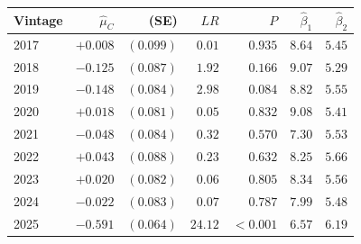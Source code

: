   \begin{tabular}{lrrrrrr}
    \hline
    Vintage & $\hat\mu_C$ & (SE) & $LR$ & $P$ & $\hat\beta_1$ & $\hat\beta_2$ \\
    \hline
    2017 & $+0.008$ & $(0.099)$ & $0.01$ & $0.935$ & $8.64$ & $5.45$ \\
    2018 & $-0.125$ & $(0.087)$ & $1.92$ & $0.166$ & $9.07$ & $5.29$ \\
    2019 & $-0.148$ & $(0.084)$ & $2.98$ & $0.084$ & $8.82$ & $5.55$ \\
    2020 & $+0.018$ & $(0.081)$ & $0.05$ & $0.832$ & $9.08$ & $5.41$ \\
    2021 & $-0.048$ & $(0.084)$ & $0.32$ & $0.570$ & $7.30$ & $5.53$ \\
    2022 & $+0.043$ & $(0.088)$ & $0.23$ & $0.632$ & $8.25$ & $5.66$ \\
    2023 & $+0.020$ & $(0.082)$ & $0.06$ & $0.805$ & $8.34$ & $5.56$ \\
    2024 & $-0.022$ & $(0.083)$ & $0.07$ & $0.787$ & $7.99$ & $5.48$ \\
    2025 & $-0.591$ & $(0.064)$ & $24.12$ & $<0.001$ & $6.57$ & $6.19$ \\
    \hline
  \end{tabular}
